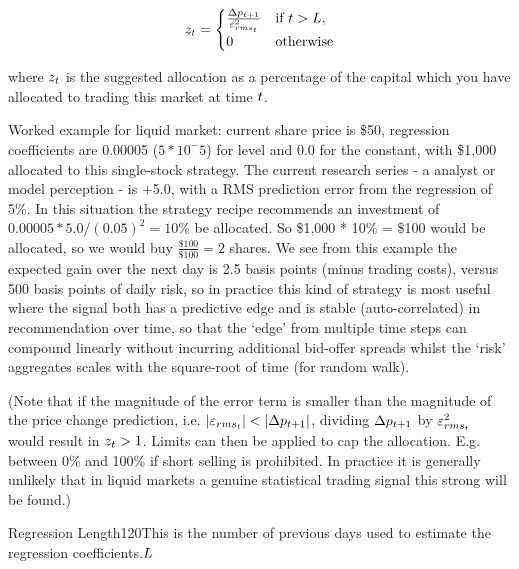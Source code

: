 \documentclass{article}%
\begin{document}
\vspace{1mm}
\begin{equation}
    z_t = 
    \begin{cases}
    \frac{\Delta p_{t+1}}{\varepsilon^{{2}}_{rms_{t}}} & \text{if } t > L,\\
    0                                        & \text{otherwise}
    \end{cases}
\end{equation}



\vspace{1mm}
\justify where $z_t$ is the suggested allocation as a percentage of the capital which you have allocated to trading this market at time $t$.

\justify Worked example for liquid market:  current share price is \$50, regression coefficients are 0.00005 ($5 * 10^-5$) for level and 0.0 for the constant, with \$1,000 allocated to this single-stock strategy.  The current research series - a analyst or model perception - is +5.0, with a RMS prediction error from the regression of 5\%. In this situation the strategy recipe recommends an investment of $0.00005 * 5.0 / (0.05)^2 = 10\%$ be allocated. So \$1,000 * 10\% = \$100 would be allocated, so we would buy $\frac{\$100}{\$100} = 2$ shares.
We see from this example the expected gain over the next day is 2.5 basis points (minus trading costs), versus 500 basis points of daily risk, so in practice this kind of strategy is most useful where the signal both has a predictive edge and is stable (auto-correlated) in recommendation over time, so that the `edge' from multiple time steps can compound linearly without incurring additional bid-offer spreads whilst the `risk' aggregates scales with the square-root of time (for random walk).


\vspace{1mm}
\justify (Note that if the magnitude of the error term is smaller than the magnitude of the price change prediction, i.e. $|\varepsilon_{rms_{t}}| < |\Delta p_{t+1}|$, dividing $\Delta p_{t+1}$ by $\varepsilon^{{2}}_{rms_{t}}$ would result in $z_t>1$. Limits can then be applied to cap the allocation. E.g. between 0\% and 100\% if short selling is prohibited. In practice it is generally unlikely that in liquid markets a genuine statistical trading signal this strong will be found.)

\vspace{1mm}
{Regression Length}{120}{This is the number of previous days used to estimate the regression coefficients.}{$L$}%
\stoptable 
\end{document}
